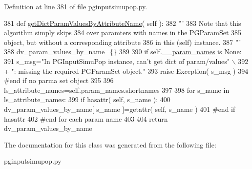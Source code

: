 Definition at line 381 of file pginputsimupop.\+py.


\begin{DoxyCode}
381     \textcolor{keyword}{def }\hyperlink{classnegui_1_1pginputsimupop_1_1PGInputSimuPop_a099e2f01dabe86e713df7519a08fecca}{getDictParamValuesByAttributeName}( self ):
382         \textcolor{stringliteral}{'''}
383 \textcolor{stringliteral}{        Note that this algorithm simply skips}
384 \textcolor{stringliteral}{        over paramters with names in the PGParamSet}
385 \textcolor{stringliteral}{        object, but without a corresponding attribute}
386 \textcolor{stringliteral}{        in this (self) instance.}
387 \textcolor{stringliteral}{        '''}
388         dv\_param\_values\_by\_name=\{\}
389 
390         \textcolor{keywordflow}{if} self.\hyperlink{classnegui_1_1pginputsimupop_1_1PGInputSimuPop_a0a737393cb4d1c66062f9403296c7f19}{\_\_param\_names} \textcolor{keywordflow}{is} \textcolor{keywordtype}{None}:
391             s\_msg=\textcolor{stringliteral}{"In PGInputSimuPop instance, can't get dict of param/values"} \(\backslash\)
392                     + \textcolor{stringliteral}{": missing the required PGParamSet object."}
393             \textcolor{keywordflow}{raise} Exception( s\_msg )
394         \textcolor{comment}{#end if no parma set object}
395 
396         ls\_attribute\_names=self.param\_names.shortnames
397 
398         \textcolor{keywordflow}{for} s\_name \textcolor{keywordflow}{in} ls\_attribute\_names:
399             \textcolor{keywordflow}{if} hasattr( self, s\_name ):
400                 dv\_param\_values\_by\_name[ s\_name ]=getattr( self, s\_name )
401             \textcolor{comment}{#end if hasattr}
402         \textcolor{comment}{#end for each param name}
403         
404         \textcolor{keywordflow}{return} dv\_param\_values\_by\_name
\end{DoxyCode}


The documentation for this class was generated from the following file\+:\begin{DoxyCompactItemize}
\item 
pginputsimupop.\+py\end{DoxyCompactItemize}
